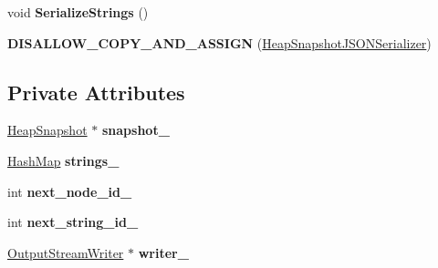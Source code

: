 \begin{DoxyCompactItemize}
\item 
void {\bfseries Serialize\+Strings} ()\hypertarget{classv8_1_1internal_1_1_heap_snapshot_j_s_o_n_serializer_aa531e95aa0889071148eb93afd52da5b}{}\label{classv8_1_1internal_1_1_heap_snapshot_j_s_o_n_serializer_aa531e95aa0889071148eb93afd52da5b}

\item 
{\bfseries D\+I\+S\+A\+L\+L\+O\+W\+\_\+\+C\+O\+P\+Y\+\_\+\+A\+N\+D\+\_\+\+A\+S\+S\+I\+GN} (\hyperlink{classv8_1_1internal_1_1_heap_snapshot_j_s_o_n_serializer}{Heap\+Snapshot\+J\+S\+O\+N\+Serializer})\hypertarget{classv8_1_1internal_1_1_heap_snapshot_j_s_o_n_serializer_ae2bb884532ccebbcd085cb11232bccce}{}\label{classv8_1_1internal_1_1_heap_snapshot_j_s_o_n_serializer_ae2bb884532ccebbcd085cb11232bccce}

\end{DoxyCompactItemize}
\subsection*{Private Attributes}
\begin{DoxyCompactItemize}
\item 
\hyperlink{classv8_1_1internal_1_1_heap_snapshot}{Heap\+Snapshot} $\ast$ {\bfseries snapshot\+\_\+}\hypertarget{classv8_1_1internal_1_1_heap_snapshot_j_s_o_n_serializer_a36e8c61706d00f48bc8c5277b351e9a6}{}\label{classv8_1_1internal_1_1_heap_snapshot_j_s_o_n_serializer_a36e8c61706d00f48bc8c5277b351e9a6}

\item 
\hyperlink{classv8_1_1internal_1_1_template_hash_map_impl}{Hash\+Map} {\bfseries strings\+\_\+}\hypertarget{classv8_1_1internal_1_1_heap_snapshot_j_s_o_n_serializer_a954c955609fd0057fe44e6150d9eccd4}{}\label{classv8_1_1internal_1_1_heap_snapshot_j_s_o_n_serializer_a954c955609fd0057fe44e6150d9eccd4}

\item 
int {\bfseries next\+\_\+node\+\_\+id\+\_\+}\hypertarget{classv8_1_1internal_1_1_heap_snapshot_j_s_o_n_serializer_a3a2589fa9dbf92e76f5d001d1f9057b9}{}\label{classv8_1_1internal_1_1_heap_snapshot_j_s_o_n_serializer_a3a2589fa9dbf92e76f5d001d1f9057b9}

\item 
int {\bfseries next\+\_\+string\+\_\+id\+\_\+}\hypertarget{classv8_1_1internal_1_1_heap_snapshot_j_s_o_n_serializer_a6ed73634b2efb6317952cae37f9b200e}{}\label{classv8_1_1internal_1_1_heap_snapshot_j_s_o_n_serializer_a6ed73634b2efb6317952cae37f9b200e}

\item 
\hyperlink{classv8_1_1internal_1_1_output_stream_writer}{Output\+Stream\+Writer} $\ast$ {\bfseries writer\+\_\+}\hypertarget{classv8_1_1internal_1_1_heap_snapshot_j_s_o_n_serializer_a7bba8953419b7f379d947649de4eeb2a}{}\label{classv8_1_1internal_1_1_heap_snapshot_j_s_o_n_serializer_a7bba8953419b7f379d947649de4eeb2a}

\end{DoxyCompactItemize}
